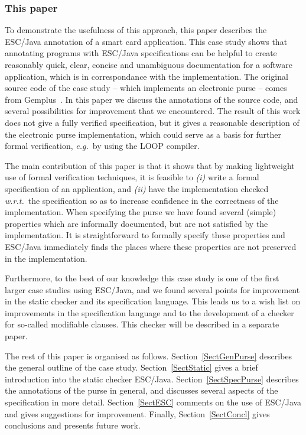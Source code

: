 \documentclass[a4paper]{llncs}
\begin{document}
\subsubsection{This paper}
To demonstrate the usefulness of this approach, this paper describes
the ESC/Java annotation of a smart card application. This case study
shows that annotating programs with ESC/Java specifications can be
helpful to create reasonably quick, clear, concise and unambiguous
documentation for a software application, which is in correspondance
with the implementation.  The original source code of the case study
-- which implements an electronic purse -- comes from
Gemplus~\cite{PurseUrl}. In this paper we discuss the annotations of
the source code, and several possibilities for improvement that we
encountered.  The result of this work does not give a fully verified
specification, but it gives a reasonable description of the electronic
purse implementation, which could serve as a basis for further formal
verification, \emph{e.g.}~by using the LOOP compiler.

The main contribution of this paper is that it shows that by making
lightweight use of formal verification techniques, it is feasible to
\emph{(i)} write a formal specification of an application, and
\emph{(ii)} have the implementation checked \emph{w.r.t.}~the 
specification so as to increase confidence in the correctness of the
implementation. When specifying the purse we have found several
(simple) properties which are informally documented, but are not
satisfied by the implementation. It is straightforward to formally
specify these properties and ESC/Java immediately finds the places
where these properties are not preserved in the implementation.

Furthermore, to the best of our knowledge this case study is one of
the first larger case studies using ESC/Java, and we found
several points for improvement in the static checker and its
specification language. This leads us to a wish list on improvements in
the specification language and to the development of a checker for
so-called modifiable clauses. This checker will be described in a
separate paper.%

The rest of this paper is organised as
follows. Section~\ref{SectGenPurse} describes the general outline of
the case study. Section~\ref{SectStatic} gives a brief introduction
into the static checker ESC/Java.  Section~\ref{SectSpecPurse}
describes the annotations of the purse in general, and discusses
several aspects of the specification in more
detail. Section~\ref{SectESC} comments on the use of ESC/Java and
gives suggestions for improvement. Finally, Section~\ref{SectConcl}
gives conclusions and presents future work.
\end{document}
